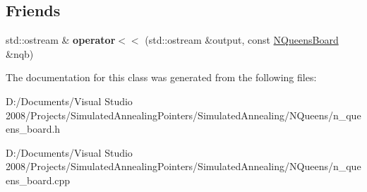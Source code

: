 \subsection*{Friends}
\begin{DoxyCompactItemize}
\item 
\hypertarget{class_n_queens_board_ac28c36f86326f8448dee159e77629501}{
std::ostream \& {\bfseries operator$<$$<$} (std::ostream \&output, const \hyperlink{class_n_queens_board}{NQueensBoard} \&nqb)}
\label{class_n_queens_board_ac28c36f86326f8448dee159e77629501}

\end{DoxyCompactItemize}


The documentation for this class was generated from the following files:\begin{DoxyCompactItemize}
\item 
D:/Documents/Visual Studio 2008/Projects/SimulatedAnnealingPointers/SimulatedAnnealing/NQueens/n\_\-queens\_\-board.h\item 
D:/Documents/Visual Studio 2008/Projects/SimulatedAnnealingPointers/SimulatedAnnealing/NQueens/n\_\-queens\_\-board.cpp\end{DoxyCompactItemize}
